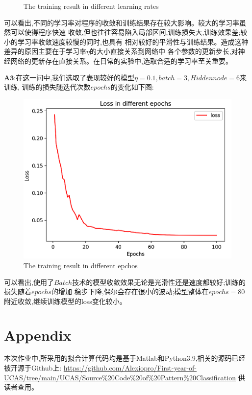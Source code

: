 \documentclass[homework]{IEEEtran}
\begin{document}
\begin{CJK}{UTF8}{gkai}
\begin{figure}[htb]
\caption{The training result in different learning rates}
\label{fig5}
\end{figure}
可以看出,不同的学习率对程序的收敛和训练结果存在较大影响。较大的学习率虽然可以使得程序快速
收敛,但也往往容易陷入局部区间,训练损失大,训练效果差;较小的学习率收敛速度较慢的同时,也具有
相对较好的平滑性与训练结果。造成这种差异的原因主要在于学习率$\eta$的大小直接关系到网络中
各个参数的更新步长,对神经网络的更新存在直接关系。在日常的实验中,选取合适的学习率至关重要。 \par
$\mathbf{A3}$:在这一问中,我们选取了表现较好的模型$\eta=0.1,batch=3,Hidden node=6$来训练,
训练的损失随迭代次数$epochs$的变化如下图:   \par
\begin{figure}[htb]
 \centerline{\includegraphics{Images/fig6.png}}
\caption{The training result in different epchos}
\label{fig6}
\end{figure}
可以看出,使用了$Batch$技术的模型收敛效果无论是光滑性还是速度都较好;训练的损失随着$epochs$的增加
稳步下降,偶尔会存在很小的波动;模型整体在$epochs=80$附近收敛,继续训练模型的loss变化较小。

\end{CJK}

\section{Appendix}
\begin{CJK}{UTF8}{gkai}
    本次作业中,所采用的拟合计算代码均是基于Matlab和Python3.9,相关的源码已经被开源于Github上:
    \url{https://github.com/Alexiopro/First-year-of-UCAS/tree/main/UCAS/Source%20Code%20of%20Pattern%20Classification}
    供读者查用。 \par
\end{CJK}
\end{document}
